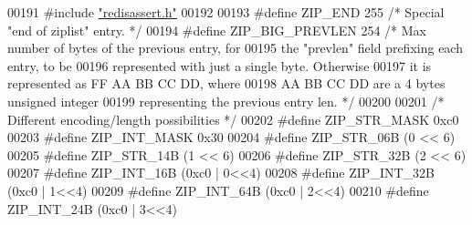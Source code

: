 \begin{DoxyCode}
00191 \textcolor{preprocessor}{#}\textcolor{preprocessor}{include} \hyperlink{redisassert_8h}{"redisassert.h"}
00192 
00193 \textcolor{preprocessor}{#}\textcolor{preprocessor}{define} \textcolor{preprocessor}{ZIP\_END} 255         \textcolor{comment}{/* Special "end of ziplist" entry. */}
00194 \textcolor{preprocessor}{#}\textcolor{preprocessor}{define} \textcolor{preprocessor}{ZIP\_BIG\_PREVLEN} 254 \textcolor{comment}{/* Max number of bytes of the previous entry, for}
00195 \textcolor{comment}{                               the "prevlen" field prefixing each entry, to be}
00196 \textcolor{comment}{                               represented with just a single byte. Otherwise}
00197 \textcolor{comment}{                               it is represented as FF AA BB CC DD, where}
00198 \textcolor{comment}{                               AA BB CC DD are a 4 bytes unsigned integer}
00199 \textcolor{comment}{                               representing the previous entry len. */}
00200 
00201 \textcolor{comment}{/* Different encoding/length possibilities */}
00202 \textcolor{preprocessor}{#}\textcolor{preprocessor}{define} \textcolor{preprocessor}{ZIP\_STR\_MASK} 0xc0
00203 \textcolor{preprocessor}{#}\textcolor{preprocessor}{define} \textcolor{preprocessor}{ZIP\_INT\_MASK} 0x30
00204 \textcolor{preprocessor}{#}\textcolor{preprocessor}{define} \textcolor{preprocessor}{ZIP\_STR\_06B} \textcolor{preprocessor}{(}0 \textcolor{preprocessor}{<<} 6\textcolor{preprocessor}{)}
00205 \textcolor{preprocessor}{#}\textcolor{preprocessor}{define} \textcolor{preprocessor}{ZIP\_STR\_14B} \textcolor{preprocessor}{(}1 \textcolor{preprocessor}{<<} 6\textcolor{preprocessor}{)}
00206 \textcolor{preprocessor}{#}\textcolor{preprocessor}{define} \textcolor{preprocessor}{ZIP\_STR\_32B} \textcolor{preprocessor}{(}2 \textcolor{preprocessor}{<<} 6\textcolor{preprocessor}{)}
00207 \textcolor{preprocessor}{#}\textcolor{preprocessor}{define} \textcolor{preprocessor}{ZIP\_INT\_16B} \textcolor{preprocessor}{(}0xc0 \textcolor{preprocessor}{|} 0\textcolor{preprocessor}{<<}4\textcolor{preprocessor}{)}
00208 \textcolor{preprocessor}{#}\textcolor{preprocessor}{define} \textcolor{preprocessor}{ZIP\_INT\_32B} \textcolor{preprocessor}{(}0xc0 \textcolor{preprocessor}{|} 1\textcolor{preprocessor}{<<}4\textcolor{preprocessor}{)}
00209 \textcolor{preprocessor}{#}\textcolor{preprocessor}{define} \textcolor{preprocessor}{ZIP\_INT\_64B} \textcolor{preprocessor}{(}0xc0 \textcolor{preprocessor}{|} 2\textcolor{preprocessor}{<<}4\textcolor{preprocessor}{)}
00210 \textcolor{preprocessor}{#}\textcolor{preprocessor}{define} \textcolor{preprocessor}{ZIP\_INT\_24B} \textcolor{preprocessor}{(}0xc0 \textcolor{preprocessor}{|} 3\textcolor{preprocessor}{<<}4\textcolor{preprocessor}{)}

\end{DoxyCode}
